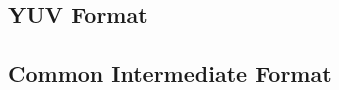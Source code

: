 
\subsection{YUV Format}
\label{subsec:yuv}

\subsection{Common Intermediate Format}
\label{subsec:cif}

